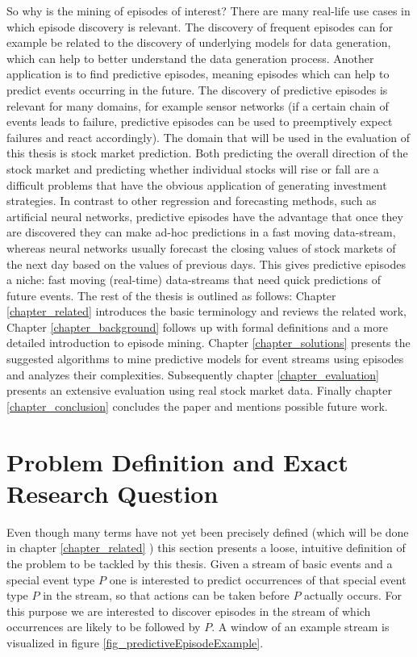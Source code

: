 So why is the mining of episodes of interest? There are many real-life use cases in which episode discovery is relevant. The discovery of frequent episodes can for example be related to the discovery of underlying models for data generation, which can help to better understand the data generation process. Another application is to find predictive episodes, meaning episodes which can help to predict events occurring in the future. The discovery of predictive episodes is relevant for many domains, for example sensor networks (if a certain chain of events leads to failure, predictive episodes can be used to preemptively expect failures and react accordingly). The domain that will be used in the evaluation of this thesis is stock market prediction. Both predicting the overall direction of the stock market and predicting whether individual stocks will rise or fall are a difficult problems that have the obvious application of generating investment strategies. \newline
In contrast to other regression and forecasting methods, such as artificial neural networks, predictive episodes have the advantage that once they are discovered they can make ad-hoc predictions in a fast moving data-stream, whereas neural networks usually forecast the closing values of stock markets of the next day based on the values of previous days. This gives predictive episodes a niche: fast moving (real-time) data-streams that need quick predictions of future events. \newline
The rest of the thesis is outlined as follows: Chapter \ref{chapter_related} introduces the basic terminology and reviews the related work, Chapter \ref{chapter_background} follows up with formal definitions and a more detailed introduction to episode mining. Chapter \ref{chapter_solutions} presents the suggested algorithms to mine predictive models for event streams using episodes and analyzes their complexities. Subsequently chapter \ref{chapter_evaluation} presents an extensive evaluation using real stock market data. Finally chapter \ref{chapter_conclusion} concludes the paper and mentions possible future work.

\section{Problem Definition and Exact Research Question}
Even though many terms have not yet been precisely defined (which will be done in chapter \ref{chapter_related} ) this section presents a loose, intuitive definition of the problem to be tackled by this thesis. Given a stream of basic events and a special event type $P$ one is interested to predict occurrences of that special event type $P$ in the stream, so that actions can be taken before $P$ actually occurs. For this purpose we are interested to discover episodes in the stream of which occurrences are likely to be followed by $P$. A window of an example stream is visualized in figure \ref{fig_predictiveEpisodeExample}.

